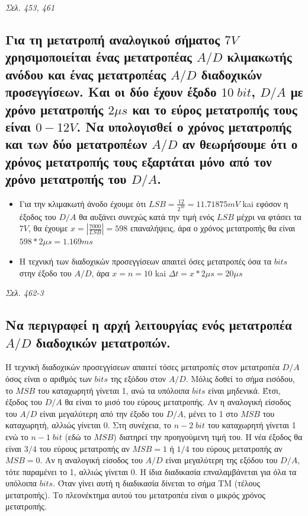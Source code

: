 \documentclass{article}
\begin{document}
\emph{Σελ. 453, 461}

\subsection{Για τη μετατροπή αναλογικού σήματος $7V$ χρησιμοποιείται ένας μετατροπέας $A/D$ κλιμακωτής ανόδου και ένας μετατροπέας $A/D$ διαδοχικών προσεγγίσεων. Και οι δύο έχουν έξοδο 
$10\; bit$, $D/A$ με χρόνο μετατροπής $2\mu s$ και το εύρος μετατροπής τους είναι $0-12V$. Να υπολογισθεί ο χρόνος μετατροπής και των δύο μετατροπέων $A/D$ αν θεωρήσουμε ότι ο χρόνος
μετατροπής τους εξαρτάται μόνο από τον χρόνο μετατροπής του $D/A$.}
    
\begin{itemize}
    \item Για την κλιμακωτή άνοδο έχουμε ότι $LSB = \frac{12}{2^{10}} = 11.71875mV$ kai εφόσον η έξοδος του $D/A$ θα αυξάνει συνεχώς κατά την τιμή ενός $LSB$ μέχρι να φτάσει τα $7V$, 
        θα έχουμε $x = |\frac{7000}{LSB}| = 598$ επαναλήψεις, άρα ο χρόνος μετατροπής θα είναι $598*2\mu s = 1.169ms$
    \item Η τεχνική των διαδοχικών προσεγγίσεων απαιτεί όσες μετατροπές όσα τα $bits$ στην έξοδο του $A/D$, άρα $x = n = 10$ kai $\Delta t = x * 2\mu s = 20\mu s$
\end{itemize}
\emph{Σελ. 462-3}

\subsection{Να περιγραφεί η αρχή λειτουργίας ενός μετατροπέα $A/D$ διαδοχικών μετατροπών.}
Η τεχνική διαδοχικών προσεγγίσεων απαιτεί τόσες μετατροπές στον μετατροπέα $D/A$ όσος είναι ο αριθμός των $bits$ της εξόδου στον $A/D$. Μόλις δοθεί το σήμα εισόδου, το 
$MSB$ του καταχωρητή γίνεται 1, ανώ τα υπόλοιπα $bits$ είναι μηδενικά. Έτσι, έξοδος του $D/A$ θα είναι το μισό του εύρους μετατροπής. Αν η αναλογική είσοδος του $A/D$ 
είναι μεγαλύτερη από την έξοδο του $D/A$, μένει το 1 στο $MSB$ του καταχωρητή, αλλιώς γίνεται 0. Στη συνέχεια, το $n-2\;bit$ του καταχωρητή γίνεται 1 ενώ το $n-1\;bit$ (εδώ το $MSB$)
διατηρεί την προηγούμενη τιμή του. Η νέα έξοδος θα είναι $3/4$ του εύρους μετατροπής αν $MSB=1$ ή $1/4$ του εύρους μετατροπής αν $MSB=0$. Αν η αναλογική είσοδος του
$A/D$ είναι μεγαλύτερη της εξόδου του $D/A$, τότε παραμένει το 1, αλλιώς γίνεται 0. Η ίδια διαδικασία επναλαμβάνεται για όλα τα υπόλοιπα $bits$. Όταν γίνει αυτή η διαδικασία 
δίνεται το σήμα ΤΜ (τέλους μετατροπής). Το πλεονέκτημα αυτού του μετατροπέα είναι ο μικρός χρόνος μετατροπής.
\end{document}
